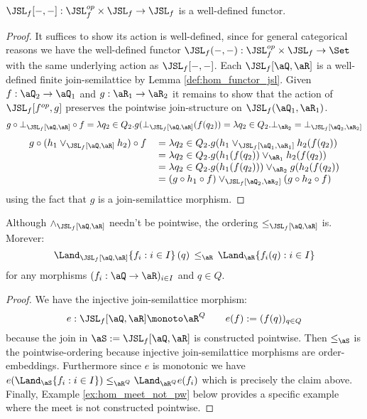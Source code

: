 \documentclass{article}
\begin{document}
\begin{lemma}
$\JSL_f[-,-] : \JSL_f^{op} \times \JSL_f \to \JSL_f$ is a well-defined functor.
\end{lemma}

\begin{proof}
It suffices to show its action is well-defined, since for general categorical reasons we have the well-defined functor $\JSL_f(-,-) : \JSL_f^{op} \times \JSL_f \to \Set$ with the same underlying action as $\JSL_f[-,-]$. Each $\JSL_f[\aQ,\aR]$ is a well-defined finite join-semilattice by Lemma \ref{def:hom_functor_jsl}. Given $f : \aQ_2 \to \aQ_1$ and $g : \aR_1 \to \aR_2$ it remains to show that the action of $\JSL_f[f^{op},g]$ preserves the pointwise join-structure on $\JSL_f(\aQ_1,\aR_1)$.
\[
g \circ \bot_{\JSL_f[\aQ,\aR]} \circ f
= \lambda q_2 \in Q_2. g(\bot_{\JSL_f[\aQ,\aR]}(f(q_2))
= \lambda q_2 \in Q_2. \bot_{\aR_2}
= \bot_{\JSL_f[\aQ_2,\aR_2]}
\]
\[
\begin{tabular}{lll}
$g \circ (h_1 \lor_{\JSL_f[\aQ,\aR]} h_2) \circ f$
&
$= \lambda q_2 \in Q_2. g(h_1 \lor_{\JSL_f[\aQ_1,\aR_1]} h_2(f(q_2))$
\\&
$= \lambda q_2 \in Q_2. g( h_1(f(q_2)) \lor_{\aR_1} h_2(f(q_2) )$
\\&
$= \lambda q_2 \in Q_2. g( h_1(f(q_2))) \lor_{\aR_2} g(h_2(f(q_2))$
\\&
$= (g \circ h_1 \circ f) \lor_{\JSL_f[\aQ_2,\aR_2]} (g \circ h_2 \circ f)$
\end{tabular}
\]
using the fact that $g$ is a join-semilattice morphism.
\end{proof}


\begin{lemma}
\label{lem:hom_meet_bound}
Although $\land_{\JSL_f[\aQ,\aR]}$ needn't be pointwise, the ordering $\leq_{\JSL_f[\aQ,\aR]}$ is. Morever:
\[
\Land_{\JSL_f[\aQ,\aR]} \{ f_i : i \in I\} \, (q) \, \leq_\aR \, \Land_\aR \{ f_i(q) : i \in I \}
\]
for any morphisms $(f_i : \aQ \to \aR)_{i \in I}$ and $q \in Q$.
\end{lemma}

\begin{proof}
We have the injective join-semilattice morphism:
\[
e : \JSL_f[\aQ,\aR] \monoto \aR^Q
\qquad
e(f) := (f(q))_{q \in Q}
\]
because the join in $\aS := \JSL_f[\aQ,\aR]$ is constructed pointwise. Then $\leq_\aS$ is the pointwise-ordering because injective join-semilattice morphisms are order-embeddings. Furthermore since $e$ is monotonic we have $e(\Land_\aS \{ f_i : i \in I\}) 
\leq_{\aR^Q} \Land_{\aR^Q} e(f_i)$ which is precisely the claim above. Finally, Example \ref{ex:hom_meet_not_pw} below provides a specific example where the meet is not constructed pointwise.
\end{proof}
\end{document}

